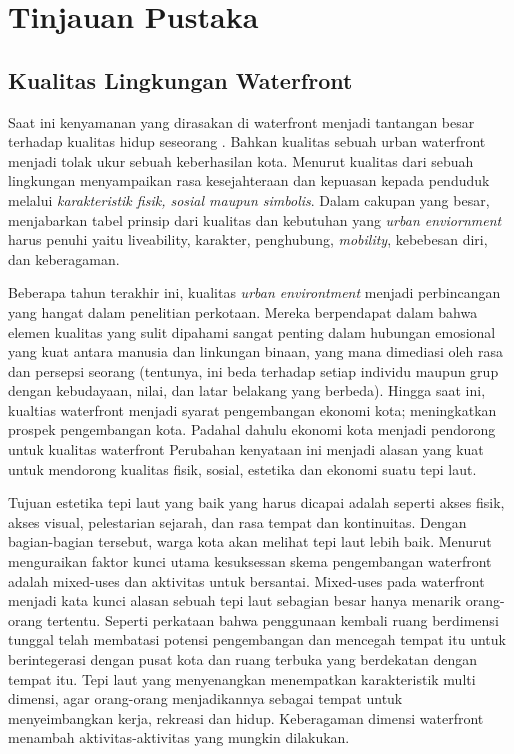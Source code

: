 \documentclass[../projects/thesis.tex]{subfiles}
\begin{document}
\chapter{Tinjauan Pustaka}\label{chap:pstk}

\section{Kualitas Lingkungan Waterfront}
Saat ini kenyamanan yang dirasakan di waterfront menjadi tantangan besar terhadap kualitas hidup seseorang \citep{li2020}. Bahkan kualitas sebuah urban waterfront menjadi tolak ukur sebuah keberhasilan kota. Menurut \cite{lansing1969evaluation} kualitas dari sebuah lingkungan menyampaikan rasa kesejahteraan dan kepuasan kepada penduduk melalui \textit{karakteristik fisik, sosial maupun simbolis}. Dalam cakupan yang besar, \cite{smith1997quality} menjabarkan tabel prinsip dari kualitas dan kebutuhan yang \textit{urban enviornment } harus penuhi yaitu \textit{}liveability, karakter, penghubung, \textit{mobility}, kebebesan diri, dan keberagaman.

Beberapa tahun terakhir ini, kualitas \textit{urban environtment} menjadi perbincangan yang hangat dalam penelitian perkotaan. Mereka berpendapat dalam \cite{hubbard1996design} bahwa elemen kualitas yang sulit dipahami sangat penting dalam hubungan emosional yang kuat antara manusia dan linkungan binaan, yang mana dimediasi oleh rasa dan persepsi seorang (tentunya, ini beda terhadap setiap individu maupun grup dengan kebudayaan, nilai, dan latar belakang yang berbeda). Hingga saat ini, kualtias waterfront menjadi syarat pengembangan ekonomi kota; meningkatkan prospek pengembangan kota. Padahal dahulu ekonomi kota menjadi pendorong untuk kualitas waterfront
Perubahan kenyataan ini menjadi alasan yang kuat untuk mendorong kualitas fisik, sosial, estetika dan ekonomi suatu tepi laut.

Tujuan estetika tepi laut yang baik yang harus dicapai adalah seperti akses fisik, akses visual, pelestarian sejarah, dan rasa tempat dan kontinuitas\citep{richarda.lehmann1966}. Dengan bagian-bagian tersebut, warga kota akan melihat tepi laut lebih baik.
Menurut \cite{tunbridge1992} menguraikan faktor kunci utama kesuksessan skema pengembangan waterfront adalah mixed-uses dan aktivitas untuk bersantai. Mixed-uses pada waterfront menjadi kata kunci alasan sebuah tepi laut sebagian besar hanya menarik orang-orang tertentu. Seperti perkataan \cite{gospodini2001} bahwa penggunaan kembali ruang berdimensi tunggal telah membatasi potensi pengembangan dan mencegah tempat itu untuk berintegerasi dengan pusat kota dan ruang terbuka yang berdekatan dengan tempat itu. Tepi laut yang menyenangkan menempatkan karakteristik multi dimensi, agar orang-orang menjadikannya sebagai tempat untuk menyeimbangkan kerja, rekreasi dan hidup. Keberagaman dimensi waterfront menambah aktivitas-aktivitas yang mungkin dilakukan.
\end{document}
